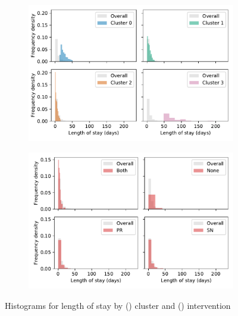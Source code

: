 \begin{figure}
    \centering
    \begin{subfigure}{\imgwidth}
        \includegraphics[width=\linewidth]{cluster_true_los}
        \caption{}\label{fig:cluster_los}
    \end{subfigure}

    \begin{subfigure}{\imgwidth}
        \includegraphics[width=\linewidth]{intervention_true_los}
        \caption{}\label{fig:intervention_los}
    \end{subfigure}
    \caption{%
        Histograms for length of stay by () cluster and
        () intervention
    }\label{fig:los}
\end{figure}

